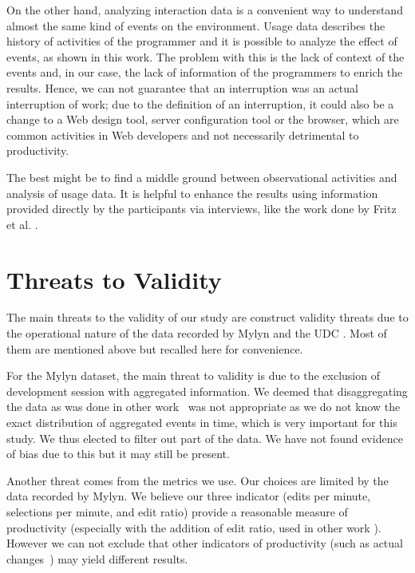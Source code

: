 \documentclass[times]{smrauth}
\begin{document}
On the other hand, analyzing interaction data is a convenient way to understand almost the same kind of events on the environment. Usage data describes the history of activities of the programmer and it is possible to analyze the effect of events, as shown in this work. The problem with this is the lack of context of the events and, in our case, the lack of information of the programmers to enrich the results. Hence, we can not guarantee that an interruption was an actual interruption of work; due to the definition of an interruption, it could also be a change to a Web design tool, server configuration tool or the browser, which are common activities in Web developers and not necessarily detrimental to productivity.

The best might be to find a middle ground between observational activities and analysis of usage data. It is helpful to enhance the results using information provided directly by the participants via interviews, like the work done by Fritz et al. \cite{FMH07}.

\section{Threats to Validity}
The main threats to the validity of our study are construct validity threats due to the operational nature of the data recorded by Mylyn and the UDC \cite{M14}. Most of them are mentioned above but recalled here for convenience.

For the Mylyn dataset, the main threat to validity is due to the exclusion of development session with aggregated information. We deemed that disaggregating the data as was done in other work~\cite{YR11}  was not appropriate as we do not know the exact distribution of aggregated events in time, which is very important for this study. We thus elected to filter out part of the data. We have not found evidence of bias due to this but it may still be present.

Another threat comes from the metrics we use. Our choices are limited by the data recorded by Mylyn. We believe our three indicator (edits per minute, selections per minute, and edit ratio) provide a reasonable measure of productivity (especially with the addition of edit ratio, used in other work \cite{KM06}). However we can not exclude that other indicators of productivity (such as actual changes~\cite{RL10}) may yield different results.
\end{document}
